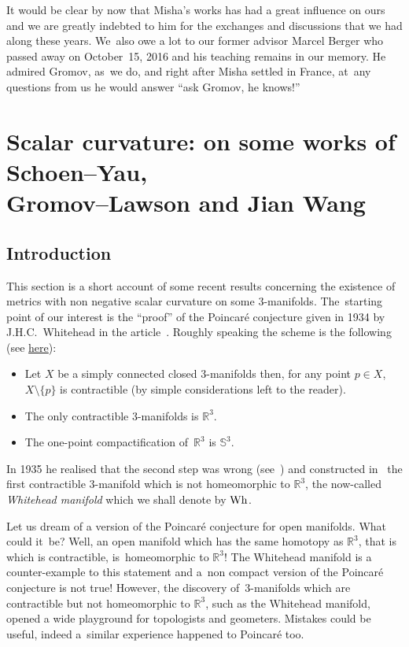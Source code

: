 \documentclass[10pt,a4paper]{amsart}
\numberwithin{equation}{section}
\begin{document}
It would be clear by now that Misha's works has had a great influence on
ours and we are greatly indebted to him for the exchanges and discussions
that we had along these years. We~also owe a lot to our former advisor Marcel Berger who passed away on October~15, 2016 and his teaching remains in our memory. He admired Gromov, as~we do, and right after Misha settled
in France, at~any questions from us he would answer ``ask Gromov, he knows!''


\section[Scalar curvature: on some works of Schoen--Yau, Gromov--Lawson and Jian Wang]{Scalar curvature: on some works of Schoen--Yau,\\ Gromov--Lawson and Jian Wang}\label{chap:scalar}

\subsection{Introduction}\label{intro:scalar}

This section is a short account of some recent results concerning the existence of metrics with non negative scalar curvature on some $3$-manifolds. The~starting point of our interest is the ``proof'' of the Poincar\'e conjecture given in 1934 by J.H.C.~Whitehead in the article~\cite{White1}. Roughly speaking the scheme is the following (see \href{https://www.math.unl.edu/~mbrittenham2/ldt/poincare.html}{here}):
\begin{itemize}\itemsep=-.2pt
 \item Let $X$ be a simply connected closed $3$-manifolds then, for any point $p\in X$, $X\setminus\{p\}$ is contractible (by simple considerations left to the reader).
 \item The only contractible $3$-manifolds is $\mathbb{R}^3$.
 \item The one-point compactification of~$\mathbb{R}^3$ is $\mathbb{S}^3$.
\end{itemize}
In 1935 he realised that the second step was wrong (see~\cite{White2}) and constructed in~\cite{White3} the first contractible $3$-manifold which is not homeomorphic to $\mathbb{R}^3$, the now-called \textit{Whitehead manifold} which we shall denote by $\rm Wh$.

Let us dream of a version of the Poincar\'e conjecture for open manifolds. What could it~be? Well, an open manifold which has the same homotopy as $\mathbb{R}^3$, that is which is contractible, is~homeomorphic to $\mathbb{R}^3$! The Whitehead manifold is a counter-example to this statement and a~non compact version of the Poincar\'e conjecture is not true! However, the discovery of~$3$-mani\-folds which are contractible but not homeomorphic to $\mathbb{R}^3$, such as the Whitehead manifold, opened a wide playground for topologists and geometers. Mistakes could be useful, indeed a~similar experience happened to Poincar\'e too.
\end{document}
